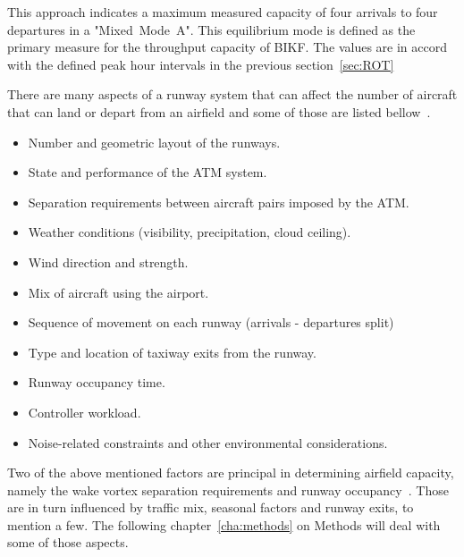 This approach indicates a maximum measured capacity of four arrivals to four departures in a "Mixed~Mode~A". This equilibrium mode is defined as the primary measure for the throughput capacity of BIKF. The values are in accord with the defined peak hour intervals in the previous section~\ref{sec:ROT}

There are many aspects of a runway system that can affect the number of aircraft that can land or depart from an airfield and some of those are listed bellow~\cite{de_neufville_airport_2013, kim_validation_2010}.
\begin{itemize}
    \item Number and geometric layout of the runways.
    \item State and performance of the ATM system.
    \item Separation requirements between aircraft pairs imposed by the ATM.
    \item Weather conditions (visibility, precipitation, cloud ceiling). 
    \item Wind direction and strength.
    \item Mix of aircraft using the airport.
    \item Sequence of movement on each runway (arrivals - departures split)
    \item Type and location of taxiway exits from the runway.
    \item Runway occupancy time.
    \item Controller workload.
    \item Noise-related constraints and other environmental considerations.
\end{itemize}

Two of the above mentioned factors are principal in determining airfield capacity, namely the wake vortex separation requirements and runway occupancy~\cite{kolos2013influence}. Those are in turn influenced by traffic mix, seasonal factors and runway exits, to mention a few. The following chapter~\ref{cha:methods} on Methods  will deal with some of those aspects. 


